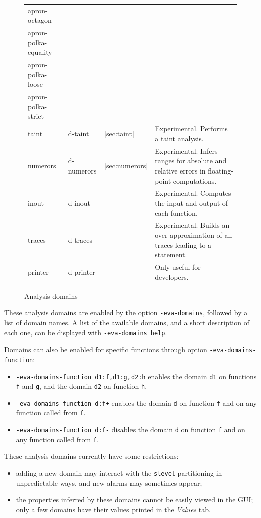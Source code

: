 \documentclass{frama-c-book}
\begin{document}
\begin{figure}
\begin{tabular}{lll>{\raggedright}m{7.5cm}}
    apron-octagon &  &  & \tabularnewline
    apron-polka-equality &  &  & \tabularnewline
    apron-polka-loose &  &  & \tabularnewline
    apron-polka-strict &  &  & \tabularnewline
    \midrule
    taint & d-taint & \ref{sec:taint} &
    Experimental. Performs a taint analysis.
    \tabularnewline
    \midrule
    numerors & d-numerors & \ref{sec:numerors} &
    Experimental. Infers ranges for absolute and relative errors
    in floating-point computations.
    \tabularnewline
    \midrule
    inout & d-inout &  &
    Experimental. Computes the input and output of each function.
    \tabularnewline
    \midrule
    traces & d-traces &  &
    Experimental. Builds an over-approximation of all traces leading to
    a statement.
    \tabularnewline
    \midrule
    printer & d-printer &  & Only useful for developers.
    \tabularnewline
    \bottomrule
  \end{tabular}

  \caption{Analysis domains \label{fig:eva-domains}}
\end{figure}

These analysis domains are enabled by the option \texttt{-eva-domains}, followed
by a list of domain names. A list of the available domains, and a short
description of each one, can be displayed with \texttt{-eva-domains help}.

Domains can also be enabled for specific functions through option
\texttt{-eva-domains-function}:
\begin{itemize}
\item \texttt{-eva-domains-function d1:f,d1:g,d2:h} enables the domain
  \texttt{d1} on functions \lstinline+f+ and \lstinline+g+, and the domain
  \texttt{d2} on function \lstinline+h+.
\item \texttt{-eva-domains-function d:f+} enables the domain
  \texttt{d} on function \lstinline+f+ and on any function called
  from \lstinline+f+.
\item \texttt{-eva-domains-function d:f-} disables the domain
  \texttt{d} on function \lstinline+f+ and on any function called
  from \lstinline+f+.
\end{itemize}

These analysis domains currently have some restrictions:
\begin{itemize}
\item adding a new domain may interact with the \lstinline+slevel+ partitioning
  in unpredictable ways, and new alarms may sometimes appear;
\item the properties inferred by these domains cannot be easily viewed in the
  GUI; only a few domains have their values printed in the \emph{Values} tab.
\end{itemize}
\end{document}
